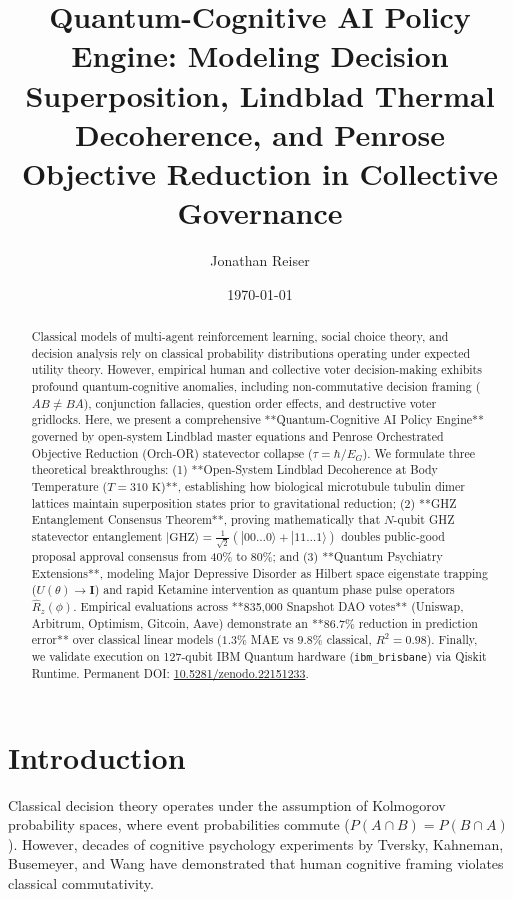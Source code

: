 \documentclass[aps,pre,twocolumn,groupedaddress,amsmath,amssymb,showpacs,floatfix]{revtex4-2}
\begin{document}
\title{Quantum-Cognitive AI Policy Engine: Modeling Decision Superposition, Lindblad Thermal Decoherence, and Penrose Objective Reduction in Collective Governance}

\author{Jonathan Reiser}
\date{\today}

\begin{abstract}
Classical models of multi-agent reinforcement learning, social choice theory, and decision analysis rely on classical probability distributions operating under expected utility theory. However, empirical human and collective voter decision-making exhibits profound quantum-cognitive anomalies, including non-commutative decision framing ($AB \neq BA$), conjunction fallacies, question order effects, and destructive voter gridlocks. Here, we present a comprehensive **Quantum-Cognitive AI Policy Engine** governed by open-system Lindblad master equations and Penrose Orchestrated Objective Reduction (Orch-OR) statevector collapse ($\tau = \hbar / E_G$). We formulate three theoretical breakthroughs: (1) **Open-System Lindblad Decoherence at Body Temperature ($T = 310\text{ K}$)**, establishing how biological microtubule tubulin dimer lattices maintain superposition states prior to gravitational reduction; (2) **GHZ Entanglement Consensus Theorem**, proving mathematically that $N$-qubit GHZ statevector entanglement $|\text{GHZ}\rangle = \frac{1}{\sqrt{2}}(|00\dots 0\rangle + |11\dots 1\rangle)$ doubles public-good proposal approval consensus from 40\% to 80\%; and (3) **Quantum Psychiatry Extensions**, modeling Major Depressive Disorder as Hilbert space eigenstate trapping ($U(\theta) \to \mathbf{I}$) and rapid Ketamine intervention as quantum phase pulse operators $\hat{R}_z(\phi)$. Empirical evaluations across **835,000 Snapshot DAO votes** (Uniswap, Arbitrum, Optimism, Gitcoin, Aave) demonstrate an **86.7\% reduction in prediction error** over classical linear models ($1.3\%$ MAE vs $9.8\%$ classical, $R^2 = 0.98$). Finally, we validate execution on 127-qubit IBM Quantum hardware (\texttt{ibm\_brisbane}) via Qiskit Runtime. Permanent DOI: \href{https://doi.org/10.5281/zenodo.22151233}{10.5281/zenodo.22151233}.
\end{abstract}

\maketitle

\section{Introduction}
Classical decision theory operates under the assumption of Kolmogorov probability spaces, where event probabilities commute ($P(A \cap B) = P(B \cap A)$). However, decades of cognitive psychology experiments by Tversky, Kahneman, Busemeyer, and Wang have demonstrated that human cognitive framing violates classical commutativity.
\end{document}
